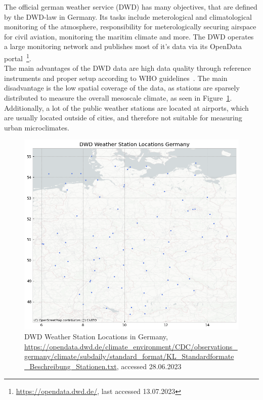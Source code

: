 The official german weather service (DWD) has many objectives, that are defined by the DWD-law in Germany. Its tasks include meterological and climatological monitoring of the atmosphere, responsibility for meterologically securing airspace for civil aviation, monitoring the maritim climate and more. The DWD operates a large monitoring network and publishes most of it's data via its OpenData portal~\footnote{\url{https://opendata.dwd.de/}, last accessed 13.07.2023}.\\
The main advantages of the DWD data are high data quality through reference instruments and proper setup according to WHO guidelines~\cite{oke2006guideline}. The main disadvantage is the low spatial coverage of the data, as stations are sparsely distributed to measure the overall mesoscale climate, as seen in Figure~\ref{fig:dwd sensor locations germany}. Additionally, a lot of the public weather stations are located at airports, which are usually located outside of cities, and therefore not suitable for measuring urban microclimates.

\begin{figure}[ht]
    \centering
    \includegraphics[width=1\textwidth]{images/dwd_weather_station_locations_germany.png}
    \caption{DWD Weather Station Locations in Germany, \url{https://opendata.dwd.de/climate_environment/CDC/observations_germany/climate/subdaily/standard_format/KL_Standardformate_Beschreibung_Stationen.txt}, accessed 28.06.2023}
    \label{fig:dwd sensor locations germany}
\end{figure}


